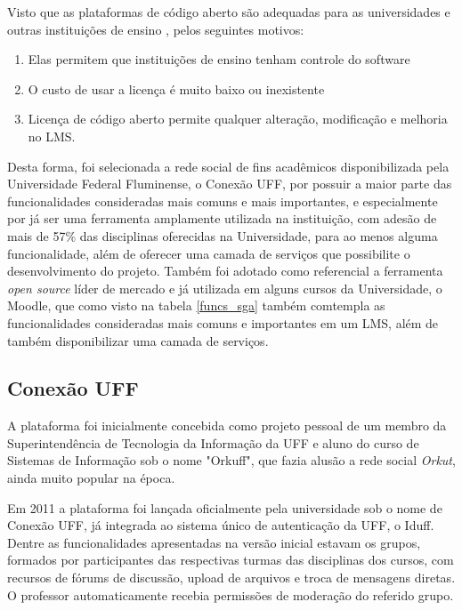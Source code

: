 Visto que as plataformas de código aberto são adequadas para as universidades e outras instituições de ensino \cite{article:itmazi}, pelos seguintes motivos: 
\begin{enumerate}
    \item Elas permitem que instituições de ensino tenham controle do software
    \item O custo de usar a licença é muito baixo ou inexistente
    \item Licença de código aberto permite qualquer alteração, modificação e melhoria no LMS.
\end{enumerate}



Desta forma, foi selecionada a rede social de fins acadêmicos disponibilizada pela Universidade Federal Fluminense, o Conexão UFF, por possuir a maior parte das funcionalidades consideradas mais comuns e mais importantes, e especialmente por já ser uma ferramenta amplamente utilizada na instituição, com adesão de mais de 57\% das disciplinas oferecidas na Universidade, para ao menos alguma funcionalidade, além de oferecer uma camada de serviços que possibilite o desenvolvimento do projeto. Também foi adotado como referencial a ferramenta \textit{open source} líder de mercado e já utilizada em alguns cursos da Universidade, o Moodle, que como visto na tabela \ref{funcs_sga} também comtempla as funcionalidades consideradas mais comuns e importantes em um LMS, além de também disponibilizar uma camada de serviços.

\subsection{Conexão UFF}

A plataforma foi inicialmente concebida como projeto pessoal de um membro da Superintendência de Tecnologia da Informação da UFF e aluno do curso de Sistemas de Informação sob o nome "Orkuff", que fazia alusão a rede social \textit{Orkut}, ainda muito popular na época.

Em 2011 a plataforma foi lançada oficialmente pela universidade sob o nome de Conexão UFF, já integrada ao sistema único de autenticação da UFF, o Iduff. Dentre as funcionalidades apresentadas na versão inicial estavam os grupos, formados por participantes das respectivas turmas das disciplinas dos cursos, com recursos de fórums de discussão, upload de arquivos e troca de mensagens diretas. O professor automaticamente recebia permissões de moderação do referido grupo.

